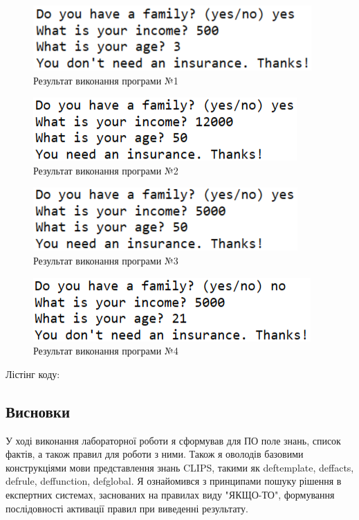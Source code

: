\begin{figure}[H]
	\centering
	    \includegraphics{test_1}
	\caption{Результат виконання програми №1}
	\label{fig:test_1}
\end{figure} 

\begin{figure}[H]
	\centering
	    \includegraphics{test_2}
	\caption{Результат виконання програми №2}
	\label{fig:test_2}
\end{figure} 

\begin{figure}[H]
	\centering
	    \includegraphics{test_3}
	\caption{Результат виконання програми №3}
	\label{fig:test_3}
\end{figure} 

\begin{figure}[H]
	\centering
	    \includegraphics{test_4}
	\caption{Результат виконання програми №4}
	\label{fig:test_4}
\end{figure} 

Лістінг коду:
 

\subsection*{Висновки}
У ході виконання лабораторної роботи я сформував для ПО поле знань, список фактів, а також правил для роботи з ними. 
Також я оволодів базовими конструкціями мови представлення знань CLIPS, такими як deftemplate, deffacts, defrule, deffunction, defglobal. 
Я ознайомився з принципами пошуку рішення в експертних системах, заснованих на правилах виду "ЯКЩО-ТО", формування послідовності активації правил при виведенні результату.


